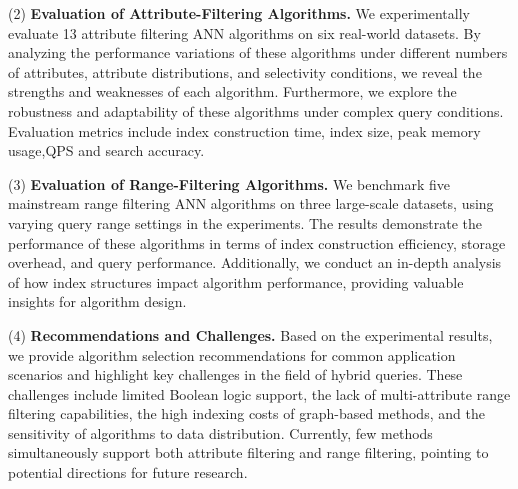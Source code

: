 \documentclass[sigconf, nonacm]{acmart}
\begin{document}
\begin{sloppypar}
(2)\textbf{ Evaluation of Attribute-Filtering Algorithms.}
We experimentally evaluate 13 attribute filtering ANN algorithms on six real-world datasets. By analyzing the performance variations of these algorithms under different numbers of attributes, attribute distributions, and selectivity conditions, we reveal the strengths and weaknesses of each algorithm. Furthermore, we explore the robustness and adaptability of these algorithms under complex query conditions. Evaluation metrics include index construction time, index size, peak memory usage,QPS and search accuracy.

(3)\textbf{ Evaluation of Range-Filtering Algorithms.}
We benchmark five mainstream range filtering ANN algorithms on three large-scale datasets, using varying query range settings in the experiments. The results demonstrate the performance of these algorithms in terms of index construction efficiency, storage overhead, and query performance. Additionally, we conduct an in-depth analysis of how index structures impact algorithm performance, providing valuable insights for algorithm design.

(4)\textbf{ Recommendations and Challenges.}
Based on the experimental results, we provide algorithm selection recommendations for common application scenarios and highlight key challenges in the field of hybrid queries. These challenges include limited Boolean logic support, the lack of multi-attribute range filtering capabilities, the high indexing costs of graph-based methods, and the sensitivity of algorithms to data distribution. Currently, few methods simultaneously support both attribute filtering and range filtering, pointing to potential directions for future research.


\end{sloppypar}
\end{document}
